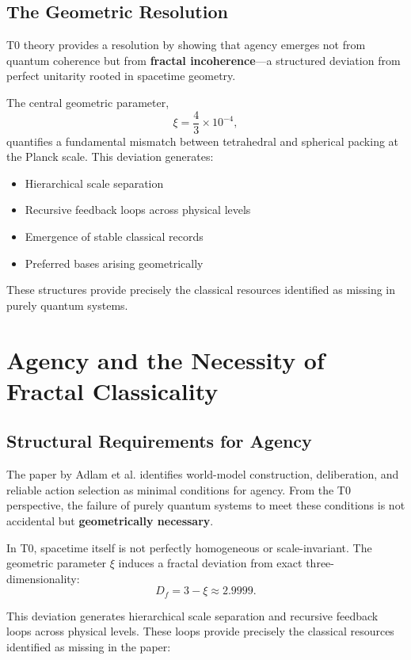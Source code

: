 	\subsection{The Geometric Resolution}
	
	T0 theory provides a resolution by showing that agency emerges not from quantum coherence but from \textbf{fractal incoherence}—a structured deviation from perfect unitarity rooted in spacetime geometry.
	
	The central geometric parameter,
	\[
	\xi = \frac{4}{3} \times 10^{-4},
	\]
	quantifies a fundamental mismatch between tetrahedral and spherical packing at the Planck scale. This deviation generates:
	
	\begin{itemize}
		\item Hierarchical scale separation
		\item Recursive feedback loops across physical levels
		\item Emergence of stable classical records
		\item Preferred bases arising geometrically
	\end{itemize}
	
	These structures provide precisely the classical resources identified as missing in purely quantum systems.
	
	\section{Agency and the Necessity of Fractal Classicality}
	
	\subsection{Structural Requirements for Agency}
	
	The paper by Adlam et al. identifies world-model construction, deliberation, and reliable action selection as minimal conditions for agency. From the T0 perspective, the failure of purely quantum systems to meet these conditions is not accidental but \textbf{geometrically necessary}.
	
	In T0, spacetime itself is not perfectly homogeneous or scale-invariant. The geometric parameter $\xi$ induces a fractal deviation from exact three-dimensionality:
	\[
	D_f = 3 - \xi \approx 2.9999.
	\]
	
	This deviation generates hierarchical scale separation and recursive feedback loops across physical levels. These loops provide precisely the classical resources identified as missing in the paper:
	
